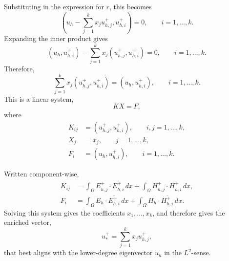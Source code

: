 \documentclass[12pt,a4paper]{article}
\begin{document}
Substituting in the expression for \(r\), this becomes
\begin{equation}
    \left(u_h - \sum_{j=1}^k x_j u^+_{h,j}, u^+_{h,i}\right)=0,
    \qquad i=1,\ldots,k.
\end{equation}
Expanding the inner product gives
\begin{equation}
    (u_h,u^+_{h,i}) - \sum_{j=1}^k x_j (u^+_{h,j},u^+_{h,i})=0,
    \qquad i=1,\ldots,k.
\end{equation}
Therefore,
\begin{equation}
    \sum_{j=1}^k x_j (u^+_{h,j},u^+_{h,i})
    = (u_h,u^+_{h,i}),
    \qquad i=1,\ldots,k.
\end{equation}
This is a linear system,
\begin{equation}
    KX=F,
\end{equation}
where
\begin{equation}
\begin{aligned}
    K_{ij} &= (u^+_{h,j},u^+_{h,i}), \qquad i,j=1,\ldots,k, \\
    X_j &= x_j, \qquad j=1,\ldots,k, \\
    F_i &= (u_h,u^+_{h,i}), \qquad i=1,\ldots,k.
\end{aligned}
\end{equation}

Written component-wise,
\begin{equation}
\begin{aligned}
    K_{ij}
    &= \int_{\Omega} E^+_{h,j}\cdot \overline{E^+_{h,i}}\,dx
       + \int_{\Omega} H^+_{h,j}\cdot \overline{H^+_{h,i}}\,dx, \\
    F_i
    &= \int_{\Omega} E_h\cdot \overline{E^+_{h,i}}\,dx
       + \int_{\Omega} H_h\cdot \overline{H^+_{h,i}}\,dx.
\end{aligned}
\end{equation}
Solving this system gives the coefficients \(x_1,\ldots,x_k\), and therefore gives the enriched vector,
\begin{equation}
    u^+_* = \sum_{j=1}^k x_j u^+_{h,j},
\end{equation}
that best aligns with the lower-degree eigenvector \(u_h\) in the \(L^2\)-sense.
\end{document}
